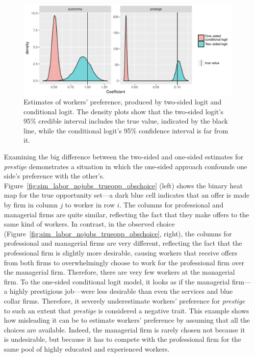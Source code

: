 \begin{figure}[!ht]
  \centering
  \includegraphics[width=\textwidth,keepaspectratio]{../figure/sim_labor_nojobs_alpha_tsl_vs_cl}
  \caption[Simulation, comparing the two-sided logit's and the
  one-sided conditional logit's estimate.]{Estimates of workers' preference,
    produced by two-sided logit and conditional logit. The density plots show
    that the two-sided logit's 95\% credible interval includes the true value,
    indicated by the black line, while the conditional logit's 95\% confidence
    interval is far from it.}
  \label{fig:sim_labor_nojobs_alpha_tsl_vs_cl}
\end{figure}

Examining the big difference between the two-sided and one-sided estimates for
\textit{prestige} demonstrates a situation in which the one-sided approach
confounds one side's preference with the other's. Figure~\ref{fig:sim_labor_nojobs_trueopp_obschoice} (left) shows the binary heat map
for the true opportunity set---a dark blue cell indicates that an offer is made by firm in
column $j$ to worker in row $i$. The columns for professional and
managerial firms are quite similar, reflecting the fact that they make offers to
the same kind of workers. In contrast, in the observed choice
(Figure~\ref{fig:sim_labor_nojobs_trueopp_obschoice}, right), the columns for
professional and managerial firms are very different,
reflecting the fact that the professional firm is slightly more
desirable, causing workers that receive offers from both firms to
overwhelmingly choose to work for the professional firm 
over the managerial firm. Therefore, there are very few workers at the
managerial firm. To the one-sided conditional
logit model, it looks
as if the managerial firm---a highly prestigious job---were less desirable than
even the services and blue collar firms. Therefore, it severely underestimate
workers' preference for \textit{prestige} to such an extent that
\textit{prestige} is considered a negative trait. This example shows how
misleading it can be to estimate workers' preference by assuming that all the
choices are available. Indeed, the managerial firm is rarely chosen not because
it is undesirable, but because it has to compete with the professional firm for
the same pool of highly educated and experienced workers.


